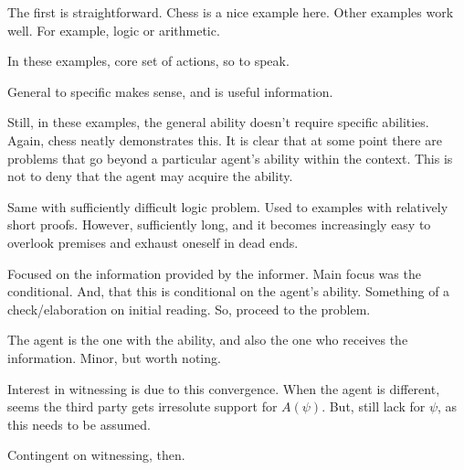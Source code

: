 \documentclass[10pt]{article}
\begin{document}
\begin{note}
  The first is straightforward.
  Chess is a nice example here.
  Other examples work well.
  For example, logic or arithmetic.

  In these examples, core set of actions, so to speak.
\end{note}

\begin{note}
  General to specific makes sense, and is useful information.

  Still, in these examples, the general ability doesn't require specific abilities.
  Again, chess neatly demonstrates this.
  It is clear that at some point there are problems that go beyond a particular agent's ability within the context.
  This is not to deny that the agent may acquire the ability.

  Same with sufficiently difficult logic problem.
  Used to examples with relatively short proofs.
  However, sufficiently long, and it becomes increasingly easy to overlook premises and exhaust oneself in dead ends.
\end{note}

\begin{note}[Summary]
  Focused on the information provided by the informer.
  Main focus was the conditional.
  And, that this is conditional on the agent's ability.
  Something of a check/elaboration on initial reading.
  So, proceed to the problem.
\end{note}

\begin{note}
  The agent is the one with the ability, and also the one who receives the information.
  Minor, but worth noting.

  Interest in witnessing is due to this convergence.
  When the agent is different, seems the third party gets irresolute support for \(A(\psi)\).
  But, still lack for \(\psi\), as this needs to be assumed.

  Contingent on witnessing, then.
\end{note}
\end{document}
